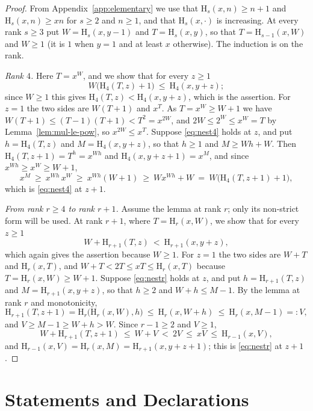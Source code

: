 \documentclass[11pt,a4paper]{article}
\theoremstyle{plain}
\theoremstyle{definition}
\newcommand{\HH}{\mathrm{H}}
\begin{document}
\begin{proof}
From Appendix~\ref{app:elementary} we use that $\HH_s(x,n)\ge n+1$ and $\HH_s(x,n)\ge xn$
for $s\ge2$ and $n\ge1$, and that $\HH_s(x,\cdot)$ is increasing. At every rank $s\ge3$
put $W=\HH_s(x,y-1)$ and $T=\HH_s(x,y)$, so that $T=\HH_{s-1}(x,W)$ and $W\ge1$ (it is
$1$ when $y=1$ and at least $x$ otherwise). The induction is on the rank.

\emph{Rank $4$.} Here $T=x^{W}$, and we show that for every $z\ge1$
\begin{equation}\label{eq:nest4}
  W\bigl(\HH_4(T,z)+1\bigr)\ \le\ \HH_4(x,y+z);
\end{equation}
since $W\ge1$ this gives $\HH_4(T,z)<\HH_4(x,y+z)$, which is the assertion. For $z=1$
the two sides are $W(T+1)$ and $x^{T}$. As $T=x^{W}\ge W+1$ we have
$W(T+1)\le(T-1)(T+1)<T^{2}=x^{2W}$, and $2W\le2^{W}\le x^{W}=T$ by
Lemma~\ref{lem:mul-le-pow}, so $x^{2W}\le x^{T}$. Suppose \eqref{eq:nest4} holds at $z$,
and put $h=\HH_4(T,z)$ and $M=\HH_4(x,y+z)$, so that $h\ge1$ and $M\ge Wh+W$. Then
$\HH_4(T,z+1)=T^{h}=x^{Wh}$ and $\HH_4(x,y+z+1)=x^{M}$, and since
$x^{Wh}\ge x^{W}\ge W+1$,
\[
  x^{M}\ \ge\ x^{Wh}\,x^{W}\ \ge\ x^{Wh}(W+1)\ \ge\ Wx^{Wh}+W
  \ =\ W\bigl(\HH_4(T,z+1)+1\bigr),
\]
which is \eqref{eq:nest4} at $z+1$.

\emph{From rank $r\ge4$ to rank $r+1$.} Assume the lemma at rank $r$; only its
non-strict form will be used. At rank $r+1$, where $T=\HH_r(x,W)$, we show that for
every $z\ge1$
\begin{equation}\label{eq:nestr}
  W+\HH_{r+1}(T,z)\ <\ \HH_{r+1}(x,y+z),
\end{equation}
which again gives the assertion because $W\ge1$. For $z=1$ the two sides are $W+T$ and
$\HH_r(x,T)$, and $W+T<2T\le xT\le\HH_r(x,T)$ because $T=\HH_r(x,W)\ge W+1$. Suppose
\eqref{eq:nestr} holds at $z$, and put $h=\HH_{r+1}(T,z)$ and $M=\HH_{r+1}(x,y+z)$, so
that $h\ge2$ and $W+h\le M-1$. By the lemma at rank $r$ and monotonicity,
\[
  \HH_{r+1}(T,z+1)=\HH_r\bigl(\HH_r(x,W),h\bigr)\ \le\ \HH_r(x,W+h)
  \ \le\ \HH_r(x,M-1)=:V,
\]
and $V\ge M-1\ge W+h>W$. Since $r-1\ge2$ and $V\ge1$,
\[
  W+\HH_{r+1}(T,z+1)\ \le\ W+V\ <\ 2V\ \le\ xV\ \le\ \HH_{r-1}(x,V),
\]
and $\HH_{r-1}(x,V)=\HH_r(x,M)=\HH_{r+1}(x,y+z+1)$; this is \eqref{eq:nestr} at $z+1$.
\end{proof}

\section*{Statements and Declarations}
\end{document}
